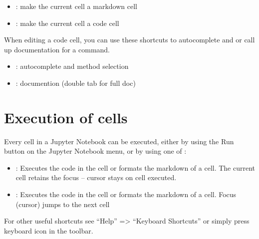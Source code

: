 \documentclass[letterpaper,10pt,english]{jupyterBook}
\begin{document}
\sphinxAtStartPar
{}
\begin{itemize}
\item {} 
\sphinxAtStartPar
{}: make the current cell a markdown cell

\item {} 
\sphinxAtStartPar
{}: make the current cell a code  cell

\end{itemize}

\sphinxAtStartPar
{}

\sphinxAtStartPar
When editing a code cell, you can use these short\sphinxhyphen{}cuts to autocomplete and or call up documentation for a command.
\begin{itemize}
\item {} 
\sphinxAtStartPar
{}: autocomplete and  method selection

\item {} 
\sphinxAtStartPar
{}: documention (double tab for full doc)

\end{itemize}


\section{Execution of cells}
\label{\detokenize{content/04_PythonEssentials/Intro_Jupyter_notebook:execution-of-cells}}
\sphinxAtStartPar
Every cell in a Jupyter Notebook can be executed, either by using the Run button on the Jupyter Notebook menu, or by using one of :
\begin{itemize}
\item {} 
\sphinxAtStartPar
{}: Executes the code in the cell or formats the markdown of a cell.  The current cell retains the focus – cursor stays on cell executed.

\item {} 
\sphinxAtStartPar
{}: Executes the code in the cell or formats the markdown of a cell. Focus (cursor) jumps to the next cell

\end{itemize}

\sphinxAtStartPar
For other useful shortcuts see “Help” => “Keyboard Shortcuts” or simply press keyboard icon in the toolbar.
\end{document}
